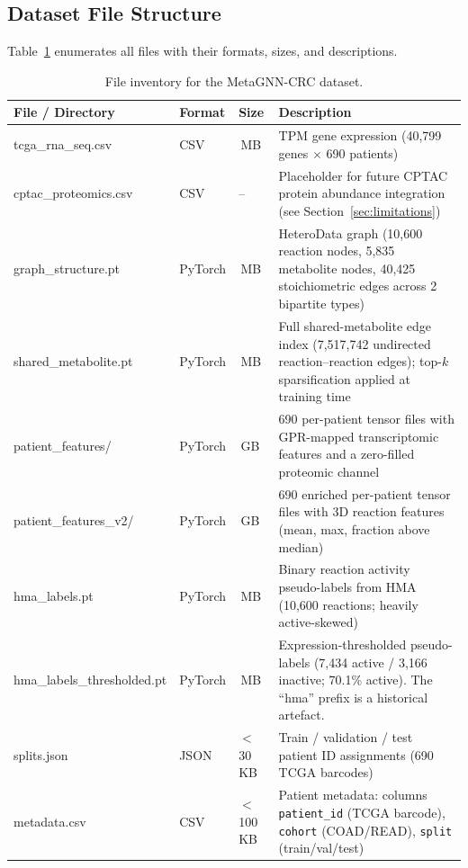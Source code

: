 \documentclass[12pt,a4paper]{article}
\begin{document}
\subsection{Dataset File Structure}

Table~\ref{tab:fileinventory} enumerates all files with their formats, sizes, and descriptions.

\begin{table}[!htbp]
\centering
\caption{File inventory for the MetaGNN-CRC dataset.}
\label{tab:fileinventory}
\scriptsize
\begin{tabularx}{\textwidth}{@{}>{\raggedright\arraybackslash\ttfamily}p{3.5cm}>{\raggedright\arraybackslash}p{1.3cm}>{\raggedright\arraybackslash}p{1.0cm}X@{}}
\toprule
\textbf{\textrm{File / Directory}} & \textbf{Format} & \textbf{Size} & \textbf{Description} \\
\midrule
tcga\_rna\_seq.csv & CSV & 178\,MB & TPM gene expression (40,799 genes $\times$ 690 patients) \\
cptac\_proteomics.csv & CSV & -- & Placeholder for future CPTAC protein abundance integration (see Section~\ref{sec:limitations}) \\
graph\_structure.pt & PyTorch & 15\,MB & HeteroData graph (10,600 reaction nodes, 5,835 metabolite nodes, 40,425 stoichiometric edges across 2 bipartite types) \\
shared\_metabolite.pt & PyTorch & 57\,MB & Full shared-metabolite edge index (7,517,742 undirected reaction--reaction edges); top-$k$ sparsification applied at training time \\
patient\_features/ & PyTorch & 1.2\,GB & 690 per-patient tensor files with GPR-mapped transcriptomic features and a zero-filled proteomic channel \\
patient\_features\_v2/ & PyTorch & 1.4\,GB & 690 enriched per-patient tensor files with 3D reaction features (mean, max, fraction above median) \\
hma\_labels.pt & PyTorch & 7\,MB & Binary reaction activity pseudo-labels from HMA (10,600 reactions; heavily active-skewed) \\
hma\_labels\_\allowbreak{}thresholded.pt & PyTorch & 7\,MB & Expression-thresholded pseudo-labels (7,434 active / 3,166 inactive; 70.1\% active). The ``hma'' prefix is a historical artefact. \\
splits.json & JSON & $<$30\,KB & Train / validation / test patient ID assignments (690 TCGA barcodes) \\
metadata.csv & CSV & $<$100\,KB & Patient metadata: columns \texttt{patient\_id} (TCGA barcode), \texttt{cohort} (COAD/READ), \texttt{split} (train/val/test) \\

\end{tabularx}
\end{table}
\end{document}
